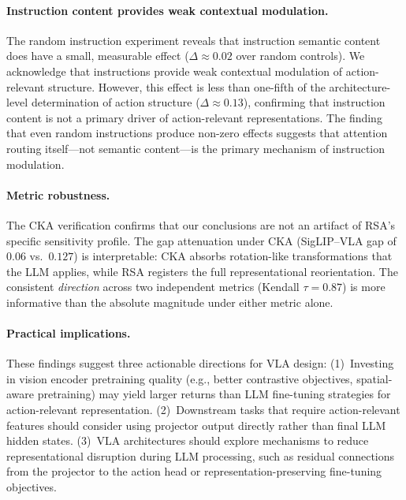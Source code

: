 \documentclass[letterpaper]{article}
\begin{document}
\paragraph{Instruction content provides weak contextual modulation.}
The random instruction experiment reveals that instruction semantic content does have a small, measurable effect ($\Delta\approx0.02$ over random controls).
We acknowledge that instructions provide weak contextual modulation of action-relevant structure.
However, this effect is less than one-fifth of the architecture-level determination of action structure ($\Delta\approx0.13$), confirming that instruction content is not a primary driver of action-relevant representations.
The finding that even random instructions produce non-zero effects suggests that attention routing itself---not semantic content---is the primary mechanism of instruction modulation.

\paragraph{Metric robustness.}
The CKA verification confirms that our conclusions are not an artifact of RSA's specific sensitivity profile.
The gap attenuation under CKA (SigLIP--VLA gap of $0.06$ vs.\ $0.127$) is interpretable: CKA absorbs rotation-like transformations that the LLM applies, while RSA registers the full representational reorientation.
The consistent \emph{direction} across two independent metrics (Kendall $\tau=0.87$) is more informative than the absolute magnitude under either metric alone.

\paragraph{Practical implications.}
These findings suggest three actionable directions for VLA design:
(1)~Investing in vision encoder pretraining quality (e.g., better contrastive objectives, spatial-aware pretraining) may yield larger returns than LLM fine-tuning strategies for action-relevant representation.
(2)~Downstream tasks that require action-relevant features should consider using projector output directly rather than final LLM hidden states.
(3)~VLA architectures should explore mechanisms to reduce representational disruption during LLM processing, such as residual connections from the projector to the action head or representation-preserving fine-tuning objectives.
\end{document}
